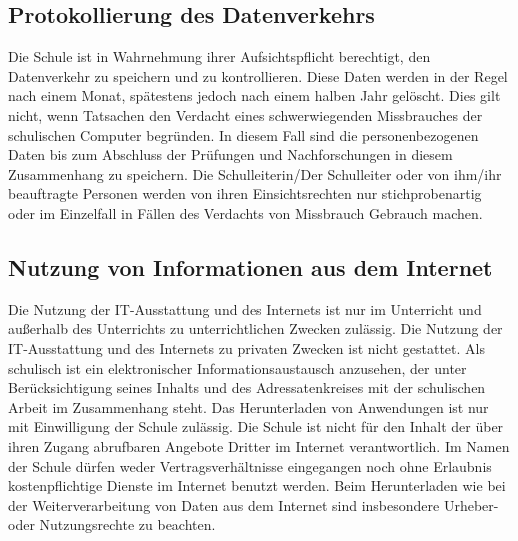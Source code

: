 \documentclass[a4paper, parskip]{scrartcl}
\begin{document}
\subsection{Protokollierung des Datenverkehrs}
Die Schule ist in Wahrnehmung ihrer Aufsichtspflicht berechtigt, den
Datenverkehr zu speichern und zu kontrollieren. Diese Daten werden in der Regel
nach einem Monat, spätestens jedoch nach einem halben Jahr gelöscht. Dies gilt
nicht, wenn Tatsachen den Verdacht eines schwerwiegenden Missbrauches der
schulischen Computer begründen. In diesem Fall sind die personenbezogenen Daten
bis zum Abschluss der Prüfungen und Nachforschungen in diesem Zusammenhang zu
speichern. Die Schulleiterin/Der Schulleiter oder von ihm/ihr beauftragte
Personen werden von ihren Einsichtsrechten nur stichprobenartig oder im
Einzelfall in Fällen des Verdachts von Missbrauch Gebrauch machen.
\subsection{Nutzung von Informationen aus dem Internet}
Die Nutzung der IT-Ausstattung und des Internets ist nur im Unterricht und
außerhalb des Unterrichts zu unterrichtlichen Zwecken zulässig. Die Nutzung der
IT-Ausstattung und des Internets zu privaten Zwecken ist nicht gestattet. Als
schulisch ist ein elektronischer Informationsaustausch anzusehen, der unter
Berücksichtigung seines Inhalts und des Adressatenkreises mit der schulischen
Arbeit im Zusammenhang steht. Das Herunterladen von Anwendungen ist nur mit
Einwilligung der Schule zulässig. Die Schule ist nicht für den Inhalt der über
ihren Zugang abrufbaren Angebote Dritter im Internet verantwortlich. Im Namen
der Schule dürfen weder Vertragsverhältnisse eingegangen noch ohne Erlaubnis
kostenpflichtige Dienste im Internet benutzt werden. Beim Herunterladen wie bei
der Weiterverarbeitung von Daten aus dem Internet sind insbesondere Urheber-
oder Nutzungsrechte zu beachten.
\end{document}
